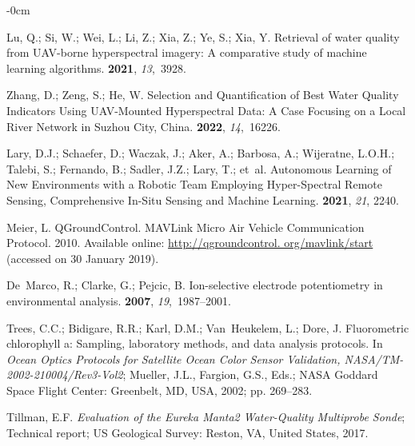 \documentclass[remotesensing,article,accept,pdftex,moreauthors]{Definitions/mdpi}
\begin{document}
\begin{adjustwidth}{-\extralength}{0cm}
\begin{thebibliography}{999}
Lu, Q.; Si, W.; Wei, L.; Li, Z.; Xia, Z.; Ye, S.; Xia, Y.
\newblock Retrieval of water quality from UAV-borne hyperspectral imagery: A
  comparative study of machine learning algorithms.
 {\bf 2021}, {\em 13},~3928.

Zhang, D.; Zeng, S.; He, W.
\newblock Selection and Quantification of Best Water Quality Indicators Using
  UAV-Mounted Hyperspectral Data: A Case Focusing on a Local River Network in
  Suzhou City, China.
 {\bf 2022}, {\em 14},~16226.

Lary, D.J.; Schaefer, D.; Waczak, J.; Aker, A.; Barbosa, A.; Wijeratne, L.O.H.;
  Talebi, S.; Fernando, B.; Sadler, J.Z.; Lary, T.;  et~al.
\newblock Autonomous Learning of New Environments with a Robotic Team Employing
  Hyper-Spectral Remote Sensing, Comprehensive In-Situ Sensing and Machine
  Learning.
 {\bf 2021}, {\em 21}, 2240.

Meier, L.
\newblock QGroundControl.
\newblock  MAVLink Micro Air Vehicle Communication Protocol. 2010. Available
  online: \url{http://qgroundcontrol. org/mavlink/start} (accessed on 30 January
  2019).

De~Marco, R.; Clarke, G.; Pejcic, B.
\newblock Ion-selective electrode potentiometry in environmental analysis.
 {\bf 2007}, {\em 19},~1987--2001.

Trees, C.C.; Bidigare, R.R.; Karl, D.M.; Van~Heukelem, L.; Dore, J.
\newblock Fluorometric chlorophyll a: Sampling, laboratory methods, and data
  analysis protocols.
\newblock In \emph{Ocean Optics Protocols for Satellite Ocean Color Sensor
  Validation, NASA/TM-2002-210004/Rev3-Vol2};  Mueller, J.L., Fargion, G.S., Eds.; NASA Goddard Space Flight Center: Greenbelt, MD, USA, {2002}; pp. 269--283.

Tillman, E.F.
\newblock \emph{Evaluation of the Eureka Manta2 Water-Quality Multiprobe Sonde};
\newblock Technical report; US Geological Survey: Reston, VA, United States, %
  2017.


\end{thebibliography}
\end{adjustwidth}
\end{document}
